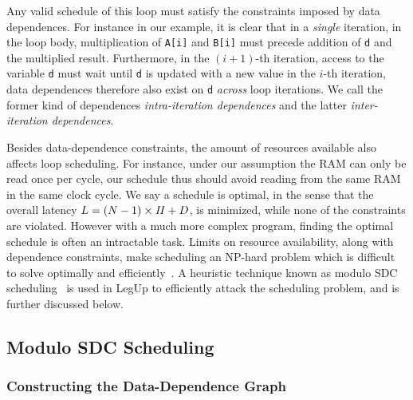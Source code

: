 Any valid schedule of this loop must satisfy the constraints imposed by data
dependences.  For instance in our example, it is clear that in a \emph{single}
iteration, in the loop body, multiplication of \verb|A[i]| and \verb|B[i]|
must precede addition of \verb|d| and the multiplied result.  Furthermore, in
the $(i + 1)$-th iteration, access to the variable \verb|d| must wait until
\verb|d| is updated with a new value in the $i$-th iteration, data dependences
therefore also exist on \verb|d| \emph{across} loop iterations.  We call the
former kind of dependences \emph{intra-iteration dependences} and the latter
\emph{inter-iteration dependences}.

Besides data-dependence constraints, the amount of resources available also
affects loop scheduling.  For instance, under our assumption the RAM can only
be read once per cycle, our schedule thus should avoid reading from the same
RAM in the same clock cycle.  We say a schedule is optimal, in the sense that
the overall latency $L = (N - 1) \times \mathit{II} + D$, is minimized, while none
of the constraints are violated.  However with a much more complex program,
finding the optimal schedule is often an intractable task.  Limits on resource
availability, along with dependence constraints, make scheduling an NP-hard
problem which is difficult to solve optimally and efficiently~\cite{hwang91}.
A heuristic technique known as modulo SDC scheduling~\cite{zhang13, canis14}
is used in LegUp to efficiently attack the scheduling problem, and is further
discussed below.


\subsection{Modulo SDC Scheduling}
\label{bg:sub:modulo_sdc_scheduling}

\subsubsection{Constructing the Data-Dependence Graph}

